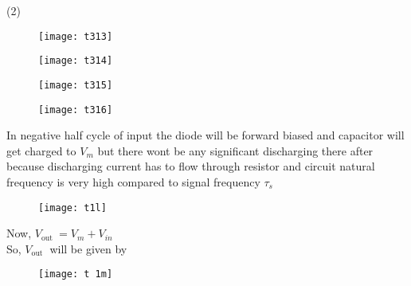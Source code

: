 \begin{questions}
\begin{minipage}{\textwidth}
\end{minipage}
\begin{tasks}(2)
	\task[\textbf{A.}] \begin{figure}[H]
		\centering
		\texttt{[image: t313]}
	\end{figure}
	\task[\textbf{B.}] \begin{figure}[H]
		\centering
		\texttt{[image: t314]}
	\end{figure}
	\task[\textbf{C.}] \begin{figure}[H]
		\centering
		\texttt{[image: t315]}
	\end{figure}
	\task[\textbf{D.}] \begin{figure}[H]
		\centering
		\texttt{[image: t316]}
	\end{figure}
\end{tasks}
\begin{answer}
In negative half cycle of input the diode will be forward biased and capacitor will get charged to $V_{m}$ but there wont be any significant discharging there after because discharging current has to flow through resistor and circuit natural frequency is very high compared to signal frequency $\tau_{s}$
\begin{figure}[H]
	\centering
	\texttt{[image: t1l]}
\end{figure}
Now, $V_{\text {out }}=V_{m}+V_{i n}$\\
So, $V_{\text {out }}$ will be given by	\\
\begin{figure}[H]
	\centering
	\texttt{[image: t 1m]}
	

\end{figure}
\end{answer}
\end{questions}
